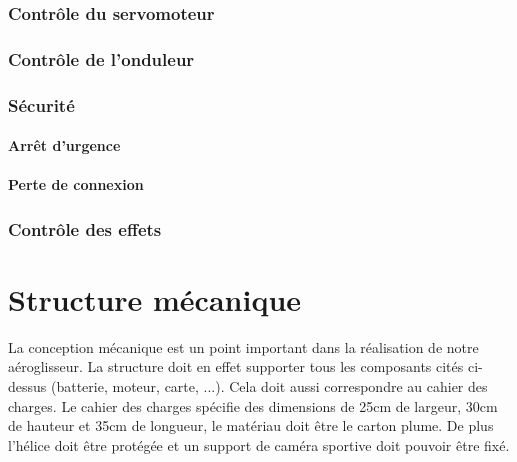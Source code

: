 \documentclass[a4paper,12pt]{book}
\begin{document}
			\subsection{Contrôle du servomoteur}
			\subsection{Contrôle de l'onduleur}
			\subsection{Sécurité}
				\subsubsection{Arrêt d'urgence}\label{secu}
				\subsubsection{Perte de connexion}
			\subsection{Contrôle des effets}
			
	\chapter{Structure mécanique}
	La conception mécanique est un point important dans la réalisation de notre aéroglisseur. La structure doit en effet supporter tous les composants cités ci-dessus (batterie, moteur, carte, ...). Cela doit aussi correspondre au cahier des charges. Le cahier des charges spécifie des dimensions de 25cm de largeur, 30cm de hauteur et 35cm de longueur, le matériau doit être le carton plume. De plus l'hélice doit être protégée et un support de caméra sportive doit pouvoir être fixé. 
\end{document}
